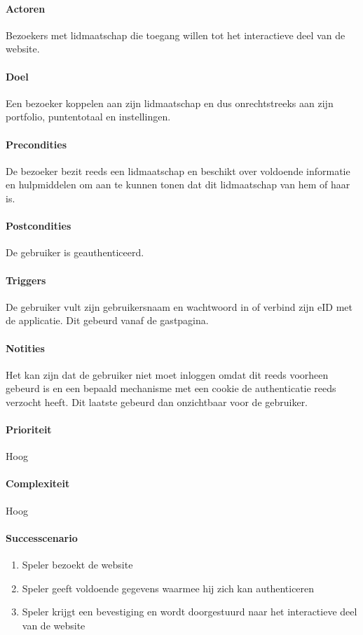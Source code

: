 \paragraph{Actoren} Bezoekers met lidmaatschap die toegang willen tot het interactieve deel van de website.
\paragraph{Doel} Een bezoeker koppelen aan zijn lidmaatschap en dus onrechtstreeks aan zijn portfolio, puntentotaal en instellingen.
\paragraph{Precondities} De bezoeker bezit reeds een lidmaatschap en beschikt over voldoende informatie en hulpmiddelen om aan te kunnen tonen dat dit lidmaatschap van hem of haar is.
\paragraph{Postcondities} De gebruiker is geauthenticeerd.
\paragraph{Triggers} De gebruiker vult zijn gebruikersnaam en wachtwoord in of verbind zijn eID met de applicatie. Dit gebeurd vanaf de gastpagina.
\paragraph{Notities} Het kan zijn dat de gebruiker niet moet inloggen omdat dit reeds voorheen gebeurd is en een bepaald mechanisme met een cookie de authenticatie reeds verzocht heeft. Dit laatste gebeurd dan onzichtbaar voor de gebruiker.
\paragraph{Prioriteit}Hoog
\paragraph{Complexiteit}Hoog
\paragraph{Successcenario}
\begin{enumerate}
 \item Speler bezoekt de website
 \item Speler geeft voldoende gegevens waarmee hij zich kan authenticeren
 \item \label{def:inloggen:bevestiging} Speler krijgt een bevestiging en wordt doorgestuurd naar het interactieve deel van de website
\end{enumerate}

